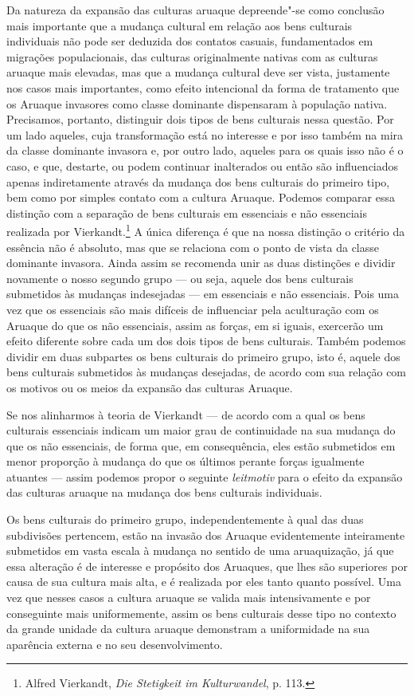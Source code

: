 Da natureza da expansão das culturas aruaque depreende"-se como
conclusão mais importante que a mudança cultural em relação aos bens
culturais individuais não pode ser deduzida dos contatos casuais,
fundamentados em migrações populacionais, das culturas originalmente
nativas com as culturas aruaque mais elevadas, mas que a mudança
cultural deve ser vista, justamente nos casos mais importantes, como
efeito intencional da forma de tratamento que os Aruaque invasores como
classe dominante dispensaram à população nativa. Precisamos, portanto,
distinguir dois tipos de bens culturais nessa questão. Por um lado
aqueles, cuja transformação está no interesse e por isso também na mira
da classe dominante invasora e, por outro lado, aqueles para os quais
isso não é o caso, e que, destarte, ou podem continuar inalterados ou
então são influenciados apenas indiretamente através da mudança dos bens
culturais do primeiro tipo, bem como por simples contato com a cultura
Aruaque. Podemos comparar essa distinção com a separação de bens
culturais em essenciais e não essenciais realizada por
Vierkandt.\footnote{Alfred Vierkandt, \emph{Die Stetigkeit im
  Kulturwandel}, p. 113.} A única diferença é que na nossa distinção o
critério da essência não é absoluto, mas que se relaciona com o ponto de
vista da classe dominante invasora. Ainda assim se recomenda unir as
duas distinções e dividir novamente o nosso segundo grupo --- ou seja,
aquele dos bens culturais submetidos às mudanças indesejadas --- em
essenciais e não essenciais. Pois uma vez que os essenciais são mais
difíceis de influenciar pela aculturação com os Aruaque do que os
não essenciais, assim as forças, em si iguais, exercerão um efeito
diferente sobre cada um dos dois tipos de bens culturais. Também podemos
dividir em duas subpartes os bens culturais do primeiro grupo, isto é,
aquele dos bens culturais submetidos às mudanças desejadas, de acordo
com sua relação com os motivos ou os meios da expansão das culturas
Aruaque.

Se nos alinharmos à teoria de Vierkandt --- de acordo com a qual os bens
culturais essenciais indicam um maior grau de continuidade na sua
mudança do que os não essenciais, de forma que, em consequência, eles
estão submetidos em menor proporção à mudança do que os últimos perante
forças igualmente atuantes --- assim podemos propor o seguinte
\emph{leitmotiv} para o efeito da expansão das culturas aruaque na
mudança dos bens culturais individuais.

Os bens culturais do primeiro grupo, independentemente à qual das duas
subdivisões pertencem, estão na invasão dos Aruaque evidentemente
inteiramente submetidos em vasta escala à mudança no sentido de uma
aruaquização, já que essa alteração é de interesse e propósito dos
Aruaques, que lhes são superiores por causa de sua cultura mais alta, e
é realizada por eles tanto quanto possível. Uma vez que nesses casos a
cultura aruaque se valida mais intensivamente e por conseguinte mais
uniformemente, assim os bens culturais desse tipo no contexto da grande
unidade da cultura aruaque demonstram a uniformidade na sua aparência
externa e no seu desenvolvimento.

